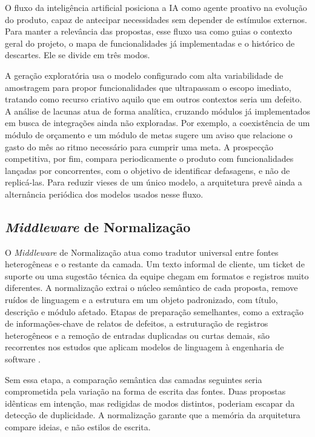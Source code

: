 O fluxo da inteligência artificial posiciona a IA como agente proativo na evolução do produto, capaz de antecipar necessidades sem depender de estímulos externos. Para manter a relevância das propostas, esse fluxo usa como guias o contexto geral do projeto, o mapa de funcionalidades já implementadas e o histórico de descartes. Ele se divide em três modos.

A geração exploratória usa o modelo configurado com alta variabilidade de amostragem para propor funcionalidades que ultrapassam o escopo imediato, tratando como recurso criativo aquilo que em outros contextos seria um defeito. A análise de lacunas atua de forma analítica, cruzando módulos já implementados em busca de integrações ainda não exploradas. Por exemplo, a coexistência de um módulo de orçamento e um módulo de metas sugere um aviso que relacione o gasto do mês ao ritmo necessário para cumprir uma meta. A prospecção competitiva, por fim, compara periodicamente o produto com funcionalidades lançadas por concorrentes, com o objetivo de identificar defasagens, e não de replicá-las. Para reduzir vieses de um único modelo, a arquitetura prevê ainda a alternância periódica dos modelos usados nesse fluxo.

\subsection[Middleware de Normalização]{\textit{Middleware} de Normalização}\label{sec:4.3.2}

O \textit{Middleware} de Normalização atua como tradutor universal entre fontes heterogêneas e o restante da camada. Um texto informal de cliente, um ticket de suporte ou uma sugestão técnica da equipe chegam em formatos e registros muito diferentes. A normalização extrai o núcleo semântico de cada proposta, remove ruídos de linguagem e a estrutura em um objeto padronizado, com título, descrição e módulo afetado. Etapas de preparação semelhantes, como a extração de informações-chave de relatos de defeitos, a estruturação de registros heterogêneos e a remoção de entradas duplicadas ou curtas demais, são recorrentes nos estudos que aplicam modelos de linguagem à engenharia de software \cite{hou2024llm4se,zhang2026survey}.

Sem essa etapa, a comparação semântica das camadas seguintes seria comprometida pela variação na forma de escrita das fontes. Duas propostas idênticas em intenção, mas redigidas de modos distintos, poderiam escapar da detecção de duplicidade. A normalização garante que a memória da arquitetura compare ideias, e não estilos de escrita.

